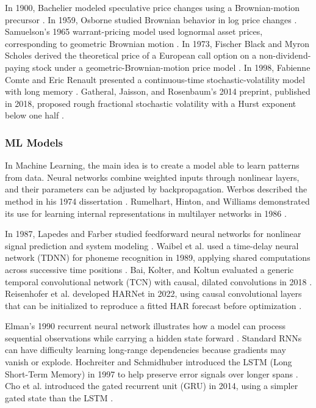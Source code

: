 \documentclass[12pt,a4paper]{article}
\numberwithin{equation}{section}
\numberwithin{table}{section}
\numberwithin{figure}{section}
\begin{document}
In 1900, Bachelier modeled speculative price changes using a Brownian-motion precursor \cite{bachelier1900}. In 1959, Osborne studied Brownian behavior in log price changes \cite{osborne1959}. Samuelson's 1965 warrant-pricing model used lognormal asset prices, corresponding to geometric Brownian motion \cite{samuelson1965}. In 1973, Fischer Black and Myron Scholes derived the theoretical price of a European call option on a non-dividend-paying stock under a geometric-Brownian-motion price model \cite{blackscholes1973}. In 1998, Fabienne Comte and Eric Renault presented a continuous-time stochastic-volatility model with long memory \cite{comterenault1998}. Gatheral, Jaisson, and Rosenbaum's 2014 preprint, published in 2018, proposed rough fractional stochastic volatility with a Hurst exponent below one half \cite{gatheral2018}.

\subsubsection{ML Models}
In Machine Learning, the main idea is to create a model able to learn patterns from data. Neural networks combine weighted inputs through nonlinear layers, and their parameters can be adjusted by backpropagation. Werbos described the method in his 1974 dissertation \cite{werbos1974}. Rumelhart, Hinton, and Williams demonstrated its use for learning internal representations in multilayer networks in 1986 \cite{rumelhart1986}.

In 1987, Lapedes and Farber studied feedforward neural networks for nonlinear signal prediction and system modeling \cite{lapedes1987}. Waibel et al. used a time-delay neural network (TDNN) for phoneme recognition in 1989, applying shared computations across successive time positions \cite{waibel1989}. Bai, Kolter, and Koltun evaluated a generic temporal convolutional network (TCN) with causal, dilated convolutions in 2018 \cite{bai2018}. Reisenhofer et al. developed HARNet in 2022, using causal convolutional layers that can be initialized to reproduce a fitted HAR forecast before optimization \cite{reisenhofer2022}.

Elman's 1990 recurrent neural network illustrates how a model can process sequential observations while carrying a hidden state forward \cite{elman1990}. Standard RNNs can have difficulty learning long-range dependencies because gradients may vanish or explode. Hochreiter and Schmidhuber introduced the LSTM (Long Short-Term Memory) in 1997 to help preserve error signals over longer spans \cite{hochreiter1997}. Cho et al. introduced the gated recurrent unit (GRU) in 2014, using a simpler gated state than the LSTM \cite{cho2014}.
\end{document}
